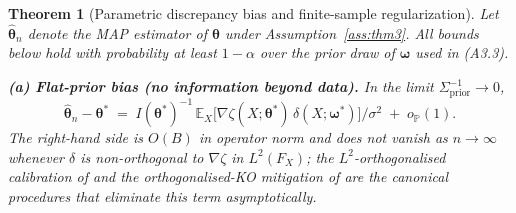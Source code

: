 \documentclass[12pt]{article}
\theoremstyle{plain}
\newtheorem{theorem}{Theorem}
\theoremstyle{definition}
\theoremstyle{remark}
\newcommand{\E}{\mathbb{E}}
\begin{document}
\begin{theorem}[Parametric discrepancy bias and finite-sample regularization]\label{thm:bias}
Let $\hat{\boldsymbol\theta}_n$ denote the MAP estimator of
$\boldsymbol\theta$ under Assumption~\ref{ass:thm3}.  All bounds below hold
with probability at least $1-\alpha$ over the prior draw of
$\boldsymbol\omega$ used in (A3.3).

\textbf{(a) Flat-prior bias (no information beyond data).}  In the
limit $\Sigma_{\mathrm{prior}}^{-1}\to 0$,
\begin{equation}\label{eq:bias_flat}
   \hat{\boldsymbol\theta}_n - \boldsymbol\theta^*
   \;=\;
   I(\boldsymbol\theta^*)^{-1}\,
   \E_X\!\bigl[\nabla\zeta(X;\boldsymbol\theta^*)\,\delta(X;\boldsymbol\omega^*)\bigr]
   /\sigma^2
   \;+\; o_{\mathbb{P}}(1).
\end{equation}
The right-hand side is $O(B)$ in operator norm and does not vanish as
$n\to\infty$ whenever $\delta$ is non-orthogonal to $\nabla\zeta$ in
$L^2(F_X)$; the $L^2$-orthogonalised calibration of \citet{TuoWu2015,TuoWu2016}
and the orthogonalised-KO mitigation of \citet{Plumlee2017} are the canonical
procedures that eliminate this term asymptotically.


\end{theorem}
\end{document}
